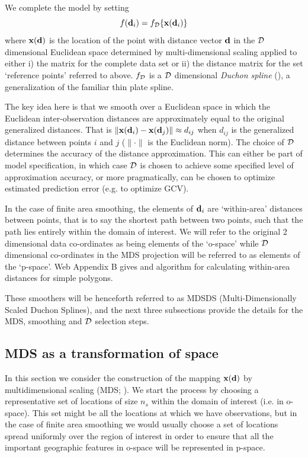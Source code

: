 \documentclass[smallextended]{svjour3}       %
\begin{document}
We complete the model by setting 
$$
f({\bf d}_i) = f_{\cal D}\{{\bf x}({\bf d}_i)\}
$$
where ${\bf x}({\bf d})$ is the location of the point with distance vector $\bf d$ in the $\cal D$ dimensional 
Euclidean space determined by multi-dimensional scaling applied to either i) the matrix for the complete data set or ii) the distance matrix for the set `reference points' referred to above. $f_{\cal D}$ is a $\cal D$ dimensional \textit{Duchon spline} (\cite{Duchon:1977tr}), a generalization of the familiar thin plate spline. 

The key idea here is that we smooth over a Euclidean space  in which the Euclidean inter-observation distances are approximately equal to the original generalized distances. That is  $\|{\bf x}({\bf d}_i) - {\bf x}({\bf d}_j) \| \approx d_{ij}$ when $d_{ij}$ is the generalized distance between points $i$ and $j$ ($\|\cdot \|$ is the Euclidean norm). The choice of $\cal D$ determines the accuracy of the distance approximation. This can either be part of model specification, in which case $\cal D$ is chosen to achieve some specified level of approximation accuracy, or more pragmatically, can be chosen to optimize estimated prediction error (e.g. to optimize GCV).

In the case of finite area smoothing, the elements of ${\bf d}_i$ are `within-area' distances between points, that is to say the shortest path between two points, such that the path lies entirely within the domain of interest. We will refer to the original 2 dimensional data co-ordinates as being elements of the `o-space' while $\cal D$ dimensional co-ordinates in the MDS projection will be referred to as elements of the `p-space'. Web Appendix B gives and algorithm for calculating within-area distances for simple polygons. 

These smoothers will be henceforth referred to as MDSDS (Multi-Dimensionally Scaled Duchon Splines), and the next three subsections provide the details for the MDS, smoothing and $\cal D$ selection steps.

\subsection{MDS as a transformation of space}

In this section we consider the construction of the mapping ${\bf x}({\bf d})$ by multidimensional scaling (MDS; \cite{Gower:1968to}). We start the process by choosing a representative set of locations of size $n_s$ within the domain of interest (i.e. in o-space). This set might be all the locations at which we have observations, but in the case of finite area smoothing we would usually choose a set of locations spread uniformly over the region of interest in order to ensure that all the important geographic features in o-space will be represented in p-space. 
\end{document}
